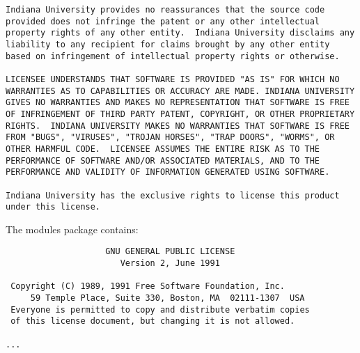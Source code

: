 \begin{verbatim}
Indiana University provides no reassurances that the source code
provided does not infringe the patent or any other intellectual
property rights of any other entity.  Indiana University disclaims any
liability to any recipient for claims brought by any other entity
based on infringement of intellectual property rights or otherwise.

LICENSEE UNDERSTANDS THAT SOFTWARE IS PROVIDED "AS IS" FOR WHICH NO
WARRANTIES AS TO CAPABILITIES OR ACCURACY ARE MADE. INDIANA UNIVERSITY
GIVES NO WARRANTIES AND MAKES NO REPRESENTATION THAT SOFTWARE IS FREE
OF INFRINGEMENT OF THIRD PARTY PATENT, COPYRIGHT, OR OTHER PROPRIETARY
RIGHTS.  INDIANA UNIVERSITY MAKES NO WARRANTIES THAT SOFTWARE IS FREE
FROM "BUGS", "VIRUSES", "TROJAN HORSES", "TRAP DOORS", "WORMS", OR
OTHER HARMFUL CODE.  LICENSEE ASSUMES THE ENTIRE RISK AS TO THE
PERFORMANCE OF SOFTWARE AND/OR ASSOCIATED MATERIALS, AND TO THE
PERFORMANCE AND VALIDITY OF INFORMATION GENERATED USING SOFTWARE.

Indiana University has the exclusive rights to license this product
under this license.
\end{verbatim}

The modules package contains:

\begin{verbatim}
                    GNU GENERAL PUBLIC LICENSE
                       Version 2, June 1991

 Copyright (C) 1989, 1991 Free Software Foundation, Inc.
     59 Temple Place, Suite 330, Boston, MA  02111-1307  USA
 Everyone is permitted to copy and distribute verbatim copies
 of this license document, but changing it is not allowed.

...
\end{verbatim}

